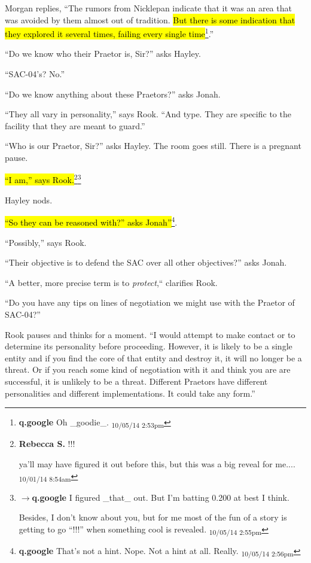 Morgan replies, ``The rumors from Nicklepan indicate that it was an area that was avoided by them almost out of tradition.  \hl{But there is some indication that they explored it several times, failing every single time}\footnote{\textbf{q.google }Oh \_goodie\_. \textsubscript{10/05/14 2:53pm}}.'' 

``Do we know who their Praetor is, Sir?'' asks Hayley.

``SAC-04's?  No.''

``Do we know anything about these Praetors?'' asks Jonah.

``They all vary in personality,'' says Rook. ``And type.  They are specific to the facility that they are meant to guard.''

``Who is our Praetor, Sir?'' asks Hayley.  The room goes still. There is a pregnant pause.

\hl{``I am,'' says Rook.}\footnote{\textbf{Rebecca S. }!!!

ya'll may have figured it out before this, but this was a big reveal for me.... \textsubscript{10/01/14 8:54am}}\footnote{$\rightarrow$\textbf{q.google }I figured \_that\_ out.  But I'm batting 0.200 at best I think.

Besides, I don't know about you, but for me most of the fun of a story is getting to go ``!!!'' when something cool is revealed. \textsubscript{10/05/14 2:55pm}}

Hayley nods.

\hl{``So they can be reasoned with?'' asks Jonah''}\footnote{\textbf{q.google }That's not a hint.  Nope.  Not a hint at all.  Really. \textsubscript{10/05/14 2:56pm}}.  

``Possibly,'' says Rook.

``Their objective is to defend the SAC over all other objectives?'' asks Jonah.

``A better, more precise term is to \textit{protect},`` clarifies Rook.

``Do you have any tips on lines of negotiation we might use with the Praetor of SAC-04?''

Rook pauses and thinks for a moment.  ``I would attempt to make contact or to determine its personality before proceeding.  However, it is likely to be a single entity and if you find the core of that entity and destroy it, it will no longer be a threat.  Or if you reach some kind of negotiation with it and think you are are successful, it is unlikely to be a threat.  Different Praetors have different personalities and different implementations.  It could take any form.''

